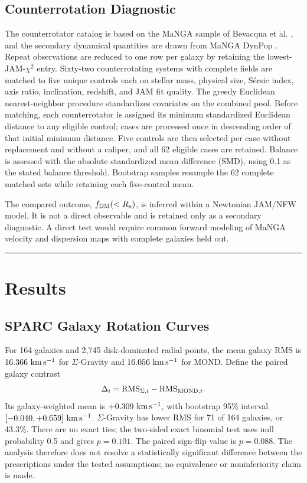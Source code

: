 \documentclass[aps,prd,reprint,superscriptaddress,showpacs,floatfix,longbibliography]{revtex4-2}
\begin{document}
\subsection{Counterrotation Diagnostic}

The counterrotator catalog is based on the MaNGA sample of Bevacqua et al. \cite{ref10}, and the secondary dynamical quantities are drawn from MaNGA DynPop \cite{ref11}. Repeat observations are reduced to one row per galaxy by retaining the lowest-JAM-$\chi^2$ entry. Sixty-two counterrotating systems with complete fields are matched to five unique controls each on stellar mass, physical size, S\'ersic index, axis ratio, inclination, redshift, and JAM fit quality. The greedy Euclidean nearest-neighbor procedure standardizes covariates on the combined pool. Before matching, each counterrotator is assigned its minimum standardized Euclidean distance to any eligible control; cases are processed once in descending order of that initial minimum distance. Five controls are then selected per case without replacement and without a caliper, and all 62 eligible cases are retained. Balance is assessed with the absolute standardized mean difference (SMD), using 0.1 as the stated balance threshold. Bootstrap samples resample the 62 complete matched sets while retaining each five-control mean.

The compared outcome, $f_{\rm DM}(<R_e)$, is inferred within a Newtonian JAM/NFW model. It is not a direct observable and is retained only as a secondary diagnostic. A direct test would require common forward modeling of MaNGA velocity and dispersion maps with complete galaxies held out.

\medskip\hrule\medskip

\section{Results}

\subsection{SPARC Galaxy Rotation Curves}

For 164 galaxies and 2,745 disk-dominated radial points, the mean galaxy RMS is $16.366\ {\rm km\,s^{-1}}$ for $\Sigma$-Gravity and $16.056\ {\rm km\,s^{-1}}$ for MOND. Define the paired galaxy contrast
\begin{equation}
\Delta_i={\rm RMS}_{\Sigma,i}-{\rm RMS}_{{\rm MOND},i}.
\label{eq:delta}
\end{equation}
Its galaxy-weighted mean is $+0.309\ {\rm km\,s^{-1}}$, with bootstrap 95\% interval $[-0.040,+0.659]\ {\rm km\,s^{-1}}$. $\Sigma$-Gravity has lower RMS for 71 of 164 galaxies, or 43.3\%. There are no exact ties; the two-sided exact binomial test uses null probability 0.5 and gives $p=0.101$. The paired sign-flip value is $p=0.088$. The analysis therefore does not resolve a statistically significant difference between the prescriptions under the tested assumptions; no equivalence or noninferiority claim is made.
\end{document}
